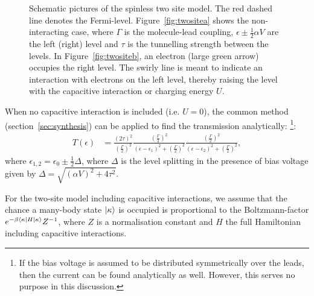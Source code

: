 \begin{figure}[!bt]
\begin{subfigure}[b]{0.48\textwidth}
    \end{subfigure}
    \caption{Schematic pictures of the spinless two site model. The red dashed line denotes the Fermi-level. Figure~\ref{fig:twositea} shows the non\hyp{}interacting case, where $\Gamma$ is the molecule-lead coupling, $\epsilon \pm \frac{1}{2} \alpha V$ are the left (right) level and $\tau$ is the tunnelling strength between the levels. In Figure~\ref{fig:twositeb}, an electron (large green arrow) occupies the right level. The swirly line is meant to indicate an interaction with electrons on the left level, thereby raising the level with the capacitive interaction or charging energy $U$.} \label{fig:twosite}
\end{figure}

When no capacitive interaction is included (i.e. $U=0$), the common method (section~\ref{sec:synthesis}) can be applied to find the transmission analytically: \cite{perrinnano}\footnote{If the bias voltage is assumed to be distributed symmetrically over the leads, then the current can be found analytically as well. However, this serves no purpose in this discussion.}:
\begin{align*}
T(\epsilon) &= \frac{ (2\tau)^2 }{(\frac{\Gamma}{2})^2} \frac{(\frac{\Gamma}{2})^2}{(\epsilon-\epsilon_1)^2 + (\frac{\Gamma}{2})^2}\frac{(\frac{\Gamma}{2})^2}{(\epsilon-\epsilon_2)^2 + (\frac{\Gamma}{2})^2},
\end{align*}
where $\epsilon_{1,2} = \epsilon_0 \pm \frac{1}{2} \Delta$, where $\Delta$ is the level splitting in the presence of bias voltage given by $\Delta = \sqrt{ (\alpha V)^2+ 4\tau^2}$. 

For the two-site model including capacitive interactions, we assume that the chance a many-body state $\ket{\kappa}$ is occupied is proportional to the Boltzmann-factor $e^{ -\beta \braket{ \kappa\left| H \right| \kappa}} Z^{-1}$, where $Z$ is a normalisation constant and $H$ the full Hamiltonian including capacitive interactions.

